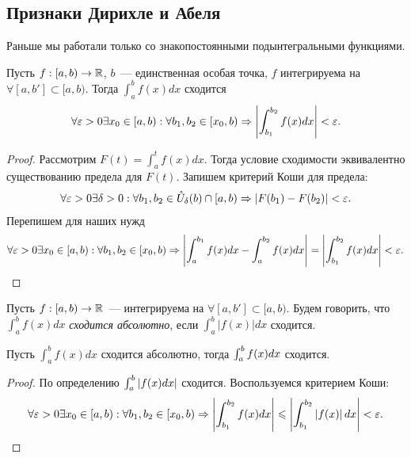 \documentclass[../main.tex]{subfiles}
\begin{document}
\subsection{Признаки Дирихле и Абеля} 
  Раньше мы работали только со знакопостоянными подынтегральными функциями.

  \begin{theorem}
    Пусть $f:[a,b) \to \mathbb{R}$, $b$~--- единственная особая точка, $f$ интегрируема на $\forall [a,b'] \subset [a,b)$. Тогда $\int_{a}^{b} f(x) dx$ сходится \nas 
    \begin{gather} 
      \forall \varepsilon > 0 \exists x_0 \in [a,b): \forall b_1, b_2 \in [x_0, b) \Rightarrow \left| \int_{b_1 }^{b_2 } f(x) dx \right|  < \varepsilon.
    \end{gather}  
  \end{theorem}

  
  \begin{proof}
    Рассмотрим $F(t) = \int_{a}^{t} f(x) dx$. Тогда условие сходимости эквивалентно существованию предела для $F(t)$. Запишем критерий Коши для предела: 
    \begin{gather} 
      \forall \varepsilon > 0 \exists \delta > 0 : \forall b_1, b_2 \in \mathring U_{\delta} (b) \cap [a,b) \Rightarrow \left| F(b_1 ) - F(b_2) \right|  < \varepsilon.
    \end{gather}
    Перепишем для наших нужд 
    \begin{gather} 
      \forall \varepsilon > 0 \exists x_0 \in [a,b) : \forall b_1, b_2 \in [x_0 ,b) \Rightarrow \left| \int_{a}^{b_1} f(x) dx - \int_{a}^{b_2} f(x) dx  \right| = \left| \int_{b_1 }^{b_2 } f(x) dx \right|  < \varepsilon.
    \end{gather}
  \end{proof}
  
  
  \begin{definition}
    Пусть $f:[a, b) \to \mathbb{R}$~--- интегрируема на $\forall [a, b'] \subset [a, b)$. Будем говорить, что $\int_{a}^{b} f(x) dx$ \emph{сходится абсолютно}, если $\int_{a}^{b} \left| f(x)  \right| dx$ сходится.    
  \end{definition}

  
  \begin{corollary}
    Пусть $\int_{a}^{b} f(x)  dx$ сходится абсолютно, тогда $\int_a^b f(x) dx$ сходится.  
  \end{corollary}
  
  
  \begin{proof}
    По определению $\int_a^b \left| f(x) dx \right| $ сходится. Воспользуемся критерием Коши: 
    \begin{gather} 
      \forall \varepsilon > 0 \exists x_0 \in [a,b): \forall b_1, b_2 \in [x_0, b) \Rightarrow \left| \int_{b_1 }^{b_2 } f(x)  dx \right| \leqslant\left| \int_{b_1 }^{b_2 } \left| f(x) \right|  dx \right|  < \varepsilon.
    \end{gather}
  \end{proof}
\end{document}
